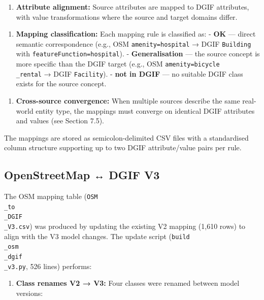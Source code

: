 \documentclass[conference]{IEEEtran}
\begin{document}
\begin{enumerate}[leftmargin=*]
\item \textbf{Attribute alignment:} Source attributes are mapped to DGIF attributes, with value transformations where the source and target domains differ.
\end{enumerate}

\begin{enumerate}[leftmargin=*]
\item \textbf{Mapping classification:} Each mapping rule is classified as:
   - \textbf{OK} — direct semantic correspondence (e.g., OSM \texttt{amenity=hospital} → DGIF \texttt{Building} with \texttt{featureFunction=hospital}).
   - \textbf{Generalisation} — the source concept is more specific than the DGIF target (e.g., OSM \texttt{amenity=bicycle\\_rental} → DGIF \texttt{Facility}).
   - \textbf{not in DGIF} — no suitable DGIF class exists for the source concept.
\end{enumerate}

\begin{enumerate}[leftmargin=*]
\item \textbf{Cross-source convergence:} When multiple sources describe the same real-world entity type, the mappings must converge on identical DGIF attributes and values (see Section 7.5).
\end{enumerate}

The mappings are stored as semicolon-delimited CSV files with a standardised column structure supporting up to two DGIF attribute/value pairs per rule.

\subsection{OpenStreetMap ↔ DGIF V3}

The OSM mapping table (\texttt{OSM\\_to\\_DGIF\\_V3.csv}) was produced by updating the existing V2 mapping (1,610 rows) to align with the V3 model changes. The update script (\texttt{build\\_osm\\_dgif\\_v3.py}, 526 lines) performs:

\begin{enumerate}[leftmargin=*]
\item \textbf{Class renames V2 → V3:} Four classes were renamed between model versions:
\end{enumerate}
\end{document}
